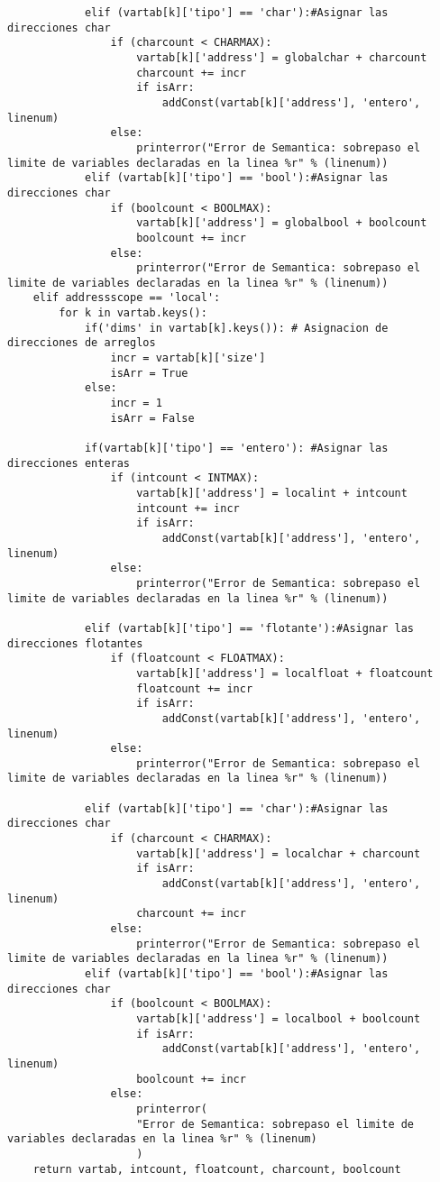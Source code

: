\documentclass[krantz1,ChapterTOCs, spanish]{krantz}
\begin{document}
\begin{verbatim}
            elif (vartab[k]['tipo'] == 'char'):#Asignar las direcciones char
                if (charcount < CHARMAX):
                    vartab[k]['address'] = globalchar + charcount
                    charcount += incr
                    if isArr:
                        addConst(vartab[k]['address'], 'entero', linenum)
                else:
                    printerror("Error de Semantica: sobrepaso el limite de variables declaradas en la linea %r" % (linenum))
            elif (vartab[k]['tipo'] == 'bool'):#Asignar las direcciones char
                if (boolcount < BOOLMAX):
                    vartab[k]['address'] = globalbool + boolcount
                    boolcount += incr
                else:
                    printerror("Error de Semantica: sobrepaso el limite de variables declaradas en la linea %r" % (linenum))
    elif addressscope == 'local':
        for k in vartab.keys():
            if('dims' in vartab[k].keys()): # Asignacion de direcciones de arreglos
                incr = vartab[k]['size']
                isArr = True
            else:
                incr = 1
                isArr = False

            if(vartab[k]['tipo'] == 'entero'): #Asignar las direcciones enteras
                if (intcount < INTMAX):
                    vartab[k]['address'] = localint + intcount
                    intcount += incr
                    if isArr:
                        addConst(vartab[k]['address'], 'entero', linenum)
                else:
                    printerror("Error de Semantica: sobrepaso el limite de variables declaradas en la linea %r" % (linenum))

            elif (vartab[k]['tipo'] == 'flotante'):#Asignar las direcciones flotantes
                if (floatcount < FLOATMAX):
                    vartab[k]['address'] = localfloat + floatcount
                    floatcount += incr
                    if isArr:
                        addConst(vartab[k]['address'], 'entero', linenum)
                else:
                    printerror("Error de Semantica: sobrepaso el limite de variables declaradas en la linea %r" % (linenum))

            elif (vartab[k]['tipo'] == 'char'):#Asignar las direcciones char
                if (charcount < CHARMAX):
                    vartab[k]['address'] = localchar + charcount
                    if isArr:
                        addConst(vartab[k]['address'], 'entero', linenum)
                    charcount += incr
                else:
                    printerror("Error de Semantica: sobrepaso el limite de variables declaradas en la linea %r" % (linenum))
            elif (vartab[k]['tipo'] == 'bool'):#Asignar las direcciones char
                if (boolcount < BOOLMAX):
                    vartab[k]['address'] = localbool + boolcount
                    if isArr:
                        addConst(vartab[k]['address'], 'entero', linenum)
                    boolcount += incr
                else:
                    printerror(
                    "Error de Semantica: sobrepaso el limite de variables declaradas en la linea %r" % (linenum)
                    )
    return vartab, intcount, floatcount, charcount, boolcount



\end{verbatim}
\end{document}
